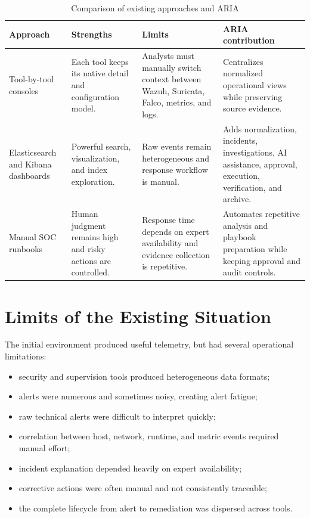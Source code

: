 \begin{table}[H]
\centering
\caption{Comparison of existing approaches and ARIA}
\begin{tabularx}{\textwidth}{@{}p{}p{}p{}Y@{}}
\toprule
\textbf{Approach} & \textbf{Strengths} & \textbf{Limits} & \textbf{ARIA contribution} \\
\midrule
Tool-by-tool consoles & Each tool keeps its native detail and configuration model. & Analysts must manually switch context between Wazuh, Suricata, Falco, metrics, and logs. & Centralizes normalized operational views while preserving source evidence. \\
Elasticsearch and Kibana dashboards & Powerful search, visualization, and index exploration. & Raw events remain heterogeneous and response workflow is manual. & Adds normalization, incidents, investigations, AI assistance, approval, execution, verification, and archive. \\
Manual SOC runbooks & Human judgment remains high and risky actions are controlled. & Response time depends on expert availability and evidence collection is repetitive. & Automates repetitive analysis and playbook preparation while keeping approval and audit controls. \\
\bottomrule
\end{tabularx}
\end{table}

\section{Limits of the Existing Situation}

The initial environment produced useful telemetry, but had several operational limitations:

\begin{itemize}[leftmargin=1cm]
\item security and supervision tools produced heterogeneous data formats;
\item alerts were numerous and sometimes noisy, creating alert fatigue;
\item raw technical alerts were difficult to interpret quickly;
\item correlation between host, network, runtime, and metric events required manual effort;
\item incident explanation depended heavily on expert availability;
\item corrective actions were often manual and not consistently traceable;
\item the complete lifecycle from alert to remediation was dispersed across tools.
\end{itemize}

